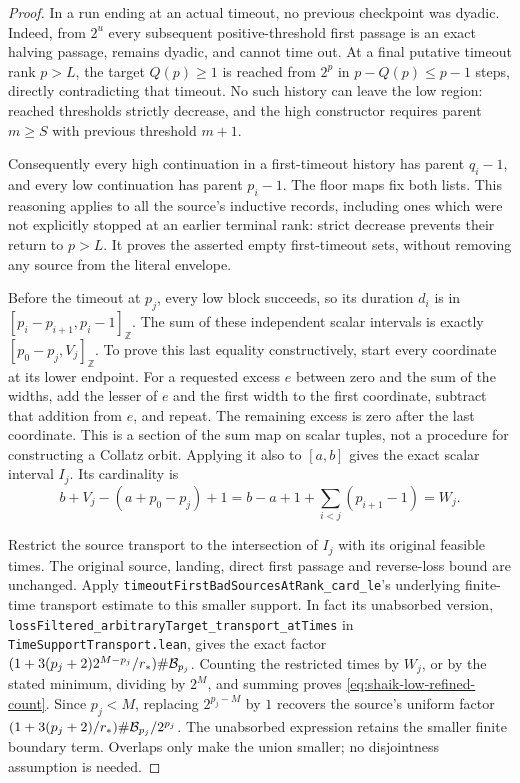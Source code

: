\documentclass[11pt]{article}
\theoremstyle{remark}\newtheorem{remark}[proposition]{Remark}
\begin{document}
\begin{proof}
In a run ending at an actual timeout, no previous checkpoint was
dyadic. Indeed, from \(2^u\) every subsequent positive-threshold
first passage is an exact halving passage, remains dyadic, and
cannot time out. At a final putative timeout rank \(p>L\), the
target \(Q(p)\ge1\) is reached from \(2^p\) in
\(p-Q(p)\le p-1\) steps, directly contradicting that timeout.
No such history can leave the low region: reached thresholds
strictly decrease, and the high constructor requires parent
\(m\ge S\) with previous threshold \(m+1\).

Consequently every high continuation in a first-timeout history has
parent \(q_i-1\), and every low continuation has parent \(p_i-1\).
The floor maps fix both lists. This reasoning applies to all the
source's inductive records, including ones which were not explicitly
stopped at an earlier terminal rank: strict decrease prevents their
return to \(p>L\). It proves the asserted empty first-timeout sets,
without removing any source from the literal envelope.

Before the timeout at \(p_j\), every low block succeeds, so its
duration \(d_i\) is in \([p_i-p_{i+1},p_i-1]_{\mathbb Z}\).
The sum of these independent scalar intervals is exactly
\([p_0-p_j,V_j]_{\mathbb Z}\). To prove this last equality
constructively, start every coordinate at its lower endpoint.
For a requested excess \(e\) between zero and the sum of the
widths, add the lesser of \(e\) and the first width to the first
coordinate, subtract that addition from \(e\), and repeat.
The remaining excess is zero after the last coordinate.
This is a section of the sum map on scalar tuples, not a procedure
for constructing a Collatz orbit. Applying it also to \([a,b]\)
gives the exact scalar interval \(I_j\). Its cardinality is
\[
 b+V_j-(a+p_0-p_j)+1
 =b-a+1+\sum_{i<j}(p_{i+1}-1)=W_j.
\]

Restrict the source transport to the intersection of \(I_j\) with
its original feasible times. The original source, landing, direct
first passage and reverse-loss bound are unchanged. Apply
\texttt{timeoutFirstBadSourcesAtRank\_card\_le}'s underlying
finite-time transport estimate to this smaller support. In fact its
unabsorbed version,
\texttt{lossFiltered\_arbitraryTarget\_transport\_atTimes}
in \texttt{TimeSupportTransport.lean}, gives the exact factor
\((1+3(p_j+2)2^{M-p_j}/r_*)\#{\cal B}_{p_j}\).
Counting the restricted times by \(W_j\), or by the stated minimum,
dividing by \(2^M\), and summing proves
\eqref{eq:shaik-low-refined-count}. Since \(p_j<M\), replacing
\(2^{p_j-M}\) by \(1\) recovers the source's uniform factor
\((1+3(p_j+2)/r_*)\#{\cal B}_{p_j}/2^{p_j}\).
The unabsorbed expression retains the smaller finite boundary term.
Overlaps only make the union smaller; no disjointness assumption is needed.
\end{proof}
\end{document}
